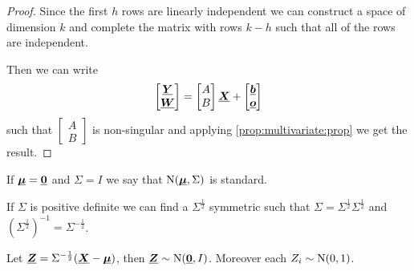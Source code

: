 \documentclass[14pt]{extarticle}
\newcommand{\Normal}{{\operatorfont N}}
\renewcommand{\vec}[1]{\uvec{#1}}
\begin{document}
\begin{proof}
    Since the first $h$ rows are linearly independent we can construct a space of dimension $k$ and complete the matrix with rows $k-h$ such that all of the rows are independent.

    Then we can write
    \begin{equation}
        \begin{bmatrix}
            \vec Y \\ \vec W
        \end{bmatrix} =
        \begin{bmatrix}
            A \\ B
        \end{bmatrix} \vec X +
        \begin{bmatrix}
            \vec b \\ \vec o
        \end{bmatrix}
    \end{equation}
    such that $\begin{bmatrix}
            A \\ B
        \end{bmatrix}$ is non-singular and applying \autoref{prop:multivariate:prop} we get the result.
\end{proof}

\begin{definition}
    If $\vec \mu = \vec 0$ and $\Sigma = I$ we say that $\Normal(\vec \mu, \Sigma)$ is standard.
\end{definition}

\begin{proposition}[standardizing]
    If $\Sigma$ is positive definite we can find a $\Sigma^{\frac{1}{2}}$ symmetric such that $\Sigma = \Sigma^{\frac{1}{2}} \Sigma^{\frac{1}{2}}$ and $\left(\Sigma^{\frac{1}{2}}\right)^{-1} = \Sigma^{-\frac{1}{2}}$.

    Let $\vec Z = \Sigma^{-\frac{1}{2}} (\vec X -\vec \mu)$, then $\vec Z \sim \Normal(\vec 0, I)$.
    Moreover each $Z_i \sim \Normal(0, 1)$.
\end{proposition}
\end{document}
